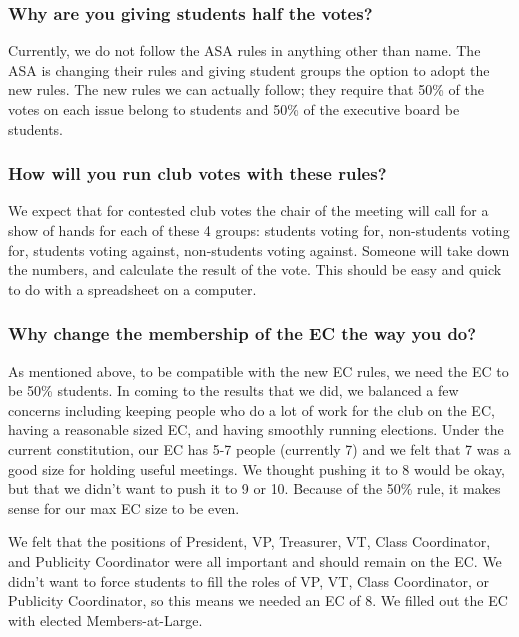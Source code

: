 \documentclass{article}
\begin{document}
\subsubsection*{Why are you giving students half the votes?}
Currently, we do not follow the ASA rules in anything other than name. The ASA is changing their rules and giving student groups the option to adopt the new rules. The new rules we can actually follow; they require that 50\% of the votes on each issue belong to students and 50\% of the executive board be students.

\subsubsection*{How will you run club votes with these rules?}
We expect that for contested club votes the chair of the meeting will call for a show of hands for each of these 4 groups: students voting for, non-students voting for, students voting against, non-students voting against. Someone will take down the numbers, and calculate the result of the vote. This should be easy and quick to do with a spreadsheet on a computer.

\subsubsection*{Why change the membership of the EC the way you do?}
As mentioned above, to be compatible with the new EC rules, we need the EC to be 50\% students. In coming to the results that we did, we balanced a few concerns including keeping people who do a lot of work for the club on the EC, having a reasonable sized EC, and having smoothly running elections. Under the current constitution, our EC has 5-7 people (currently 7) and we felt that 7 was a good size for holding useful meetings. We thought pushing it to 8 would be okay, but that we didn't want to push it to 9 or 10. Because of the 50\% rule, it makes sense for our max EC size to be even.

We felt that the positions of President, VP, Treasurer, VT, Class Coordinator, and Publicity Coordinator were all important and should remain on the EC. We didn't want to force students to fill the roles of VP, VT, Class Coordinator, or Publicity Coordinator, so this means we needed an EC of 8. We filled out the EC with elected  Members-at-Large.
\end{document}
